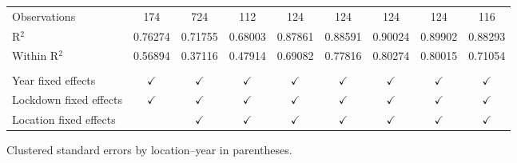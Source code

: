 \begin{tabular}{lcccccccc}
   Observations                      & 174            & 724            & 112           & 124            & 124            & 124            & 124            & 116\\  
   R$^2$                             & 0.76274        & 0.71755        & 0.68003       & 0.87861        & 0.88591        & 0.90024        & 0.89902        & 0.88293\\  
   Within R$^2$                      & 0.56894        & 0.37116        & 0.47914       & 0.69082        & 0.77816        & 0.80274        & 0.80015        & 0.71054\\  
    \\
   Year fixed effects                & $\checkmark$   & $\checkmark$   & $\checkmark$  & $\checkmark$   & $\checkmark$   & $\checkmark$   & $\checkmark$   & $\checkmark$\\   
   Lockdown fixed effects            & $\checkmark$   & $\checkmark$   & $\checkmark$  & $\checkmark$   & $\checkmark$   & $\checkmark$   & $\checkmark$   & $\checkmark$\\   
   Location fixed effects            &                & $\checkmark$   & $\checkmark$  & $\checkmark$   & $\checkmark$   & $\checkmark$   & $\checkmark$   & $\checkmark$\\   
   \bottomrule
\end{tabular}
 
\par \raggedright 
Clustered standard errors by location--year in parentheses.
\par\endgroup


